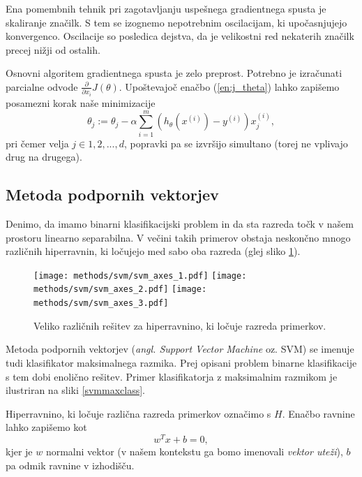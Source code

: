 \documentclass[11pt,a4paper,openany]{book}
\begin{document}
Ena pomembnih tehnik pri zagotavljanju uspešnega gradientnega spusta je skaliranje značilk. S tem se izognemo nepotrebnim oscilacijam, ki upočasnjujejo konvergenco. Oscilacije so posledica dejstva, da je velikostni red nekaterih značilk precej nižji od ostalih.

Osnovni algoritem gradientnega spusta je zelo preprost. Potrebno je izračunati parcialne odvode $\frac{\partial}{\partial x_i}J(\theta)$. Upoštevajoč enačbo (\ref{en:j_theta}) lahko zapišemo posamezni korak naše minimizacije
\begin{equation}
	\theta_j := \theta_j - \alpha \sum^m_{i = 1}(h_\theta(x^{(i)}) - y^{(i)})x_j^{(i)},
	\label{en:log_reg_update}
\end{equation}  
pri čemer velja $j \in {1, 2, ...,  d}$, popravki pa se izvršijo simultano (torej ne vplivajo drug na drugega).



\subsection{Metoda podpornih vektorjev}

Denimo, da imamo binarni klasifikacijski problem in da sta razreda točk v našem prostoru linearno separabilna. V večini takih primerov obstaja neskončno mnogo različnih hiperravnin, ki ločujejo med sabo oba razreda (glej sliko \ref{svmseparable}).

\begin{figure}[ht]
	\texttt{[image: methods/svm/svm\_axes\_1.pdf]}
	\texttt{[image: methods/svm/svm\_axes\_2.pdf]}
	\texttt{[image: methods/svm/svm\_axes\_3.pdf]}	
	
	\caption{Veliko različnih rešitev za hiperravnino, ki ločuje razreda primerkov.}
	\label{svmseparable}
\end{figure}

Metoda podpornih vektorjev (\textit{angl. Support Vector Machine} oz. SVM) se imenuje tudi klasifikator maksimalnega razmika. Prej opisani problem binarne klasifikacije s tem dobi enolično rešitev. Primer klasifikatorja z maksimalnim razmikom je ilustriran na sliki \ref{svmmaxclass}.



Hiperravnino, ki ločuje različna razreda primerkov označimo s $H$. Enačbo ravnine lahko zapišemo kot
\begin{equation}
  w^T x + b = 0,
\end{equation}
kjer je $w$ normalni vektor (v našem kontekstu ga bomo imenovali \textit{vektor uteži}), $b$ pa odmik ravnine v izhodišču.
\end{document}
